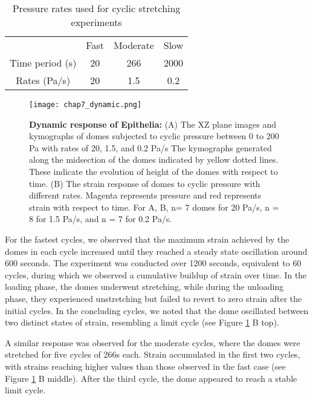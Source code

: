 \begin{center}
	\begin{table}[]
		\label{tab:hysteresis}
		\centering
		\begin{tabular}{c c c c}
			& Fast & Moderate & Slow \\ 
			Time period (s) & 20   & 266      & 2000 \\ 
			Rates (Pa/s)    & 20   & 1.5      & 0.2  \\ 
		\end{tabular}
		\caption{Pressure rates used for cyclic stretching experiments}
	\end{table}
\end{center}

\begin{figure}[]
	\centering
	\texttt{[image: chap7\_dynamic.png]}
	\caption{\label{fig_7_6} \textbf{Dynamic response of Epithelia:} (A) The XZ plane images and kymographs of domes subjected to cyclic pressure between 0 to 200 Pa with rates of 20, 1.5, and 0.2 Pa/s The kymographs generated along the midsection of the domes indicated by yellow dotted lines. These indicate the evolution of height of the domes with respect to time. (B) The strain response of domes to cyclic pressure with different rates. Magenta represents pressure and red represents strain with respect to time. For A, B, n= 7 domes for 20 Pa/s, n = 8 for 1.5 Pa/s, and n = 7 for 0.2 Pa/s. 
	}
\end{figure}

For the fastest cycles, we observed that the maximum strain achieved by the domes in each cycle increased until they reached a steady state oscillation around 600 seconds.
The experiment was conducted over 1200 seconds, equivalent to 60 cycles, during which we observed a cumulative buildup of strain over time. In the loading phase, the domes underwent stretching, while during the unloading phase, they experienced unstretching but failed to revert to zero strain after the initial cycles. In the concluding cycles, we noted that the dome oscillated between two distinct states of strain, resembling a limit cycle (see Figure \ref{fig_7_6} B top).

A similar response was observed for the moderate cycles, where the domes were stretched for five cycles of 266s each. Strain accumulated in the first two cycles, with strains reaching higher values than those observed in the fast case (see Figure \ref{fig_7_6} B middle). After the third cycle, the dome appeared to reach a stable limit cycle.

